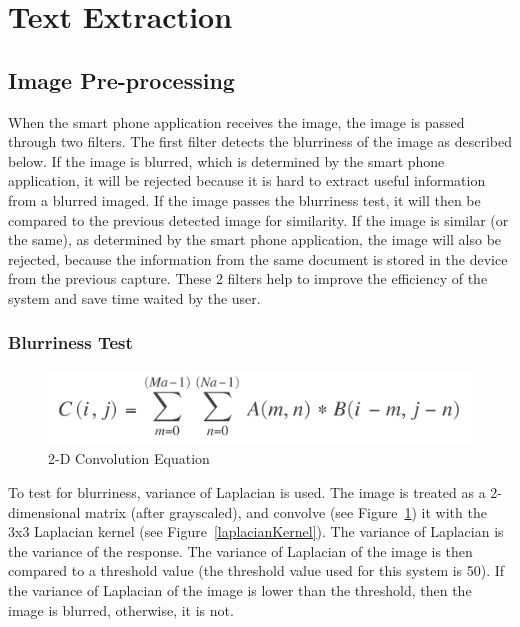 \section{Text Extraction}

\subsection{Image Pre-processing}
When the smart phone application receives the image, the image is passed through two filters. The first filter detects the blurriness of the image as described below. If the image is blurred, which is determined by the smart phone application, it will be rejected because it is hard to extract useful information from a blurred imaged. If the image passes the blurriness test, it will then be compared to the previous detected image for similarity. If the image is similar (or the same), as determined by the smart phone application, the image will also be rejected, because the information from the same document is stored in the device from the previous capture. These 2 filters help to improve the efficiency of the system and save time waited by the user.

\subsubsection{Blurriness Test}
\begin{figure}
	\centering
    \includegraphics[scale = 0.4]{convolution.png}
    
    \caption{2-D Convolution Equation}
	\label{convolution}
\end{figure}
To test for blurriness, variance of Laplacian \cite{PechPacheco} is used. The image is treated as a 2-dimensional matrix (after grayscaled), and convolve (see Figure~\ref{convolution}) it with the 3x3 Laplacian kernel (see Figure~\ref{laplacianKernel}). The variance of Laplacian is the variance of the response. The variance of Laplacian of the image is then compared to a threshold value (the threshold value used for this system is 50). If the variance of Laplacian of the image is lower than the threshold, then the image is blurred, otherwise, it is not.

